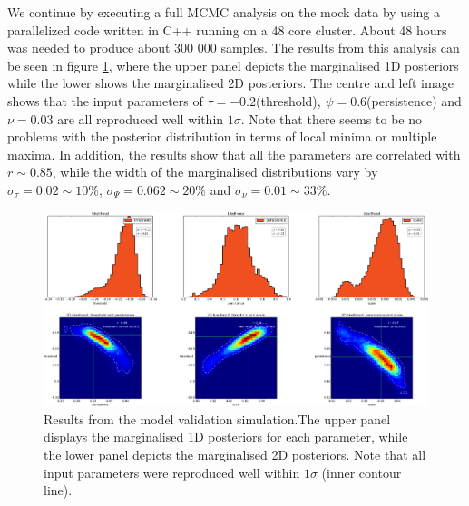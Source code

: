 \documentclass[aps,pre,twocolumn,letterpaper,floatfix,showpacs]{revtex4}
\begin{document}
We continue by executing a full MCMC analysis on the mock data by using a
parallelized code written in C++ running on a 48 core cluster. About 48 hours
was needed to produce about 300 000 samples. The results from this analysis
can be seen in figure \ref{fig:mockdataresults_pts}, where the upper panel
depicts the marginalised 1D posteriors while the lower shows the marginalised
2D posteriors. The centre and left image shows that the input parameters of
$\tau=-0.2$(threshold), $\psi=0.6$(persistence) and $\nu=0.03$ are all reproduced
well within $1 \sigma$. Note that there seems to be no problems with the posterior
distribution in terms of local minima or multiple maxima. In addition, the results
show that all the parameters are correlated with $r \sim 0.85$, while the width of
the marginalised distributions vary by $\sigma_\tau = 0.02 \sim 10\%$, $\sigma_\Psi = 0.062 \sim 20\%$ and $\sigma_\nu = 0.01 \sim 33\%$. 

\begin{figure}
\includegraphics[width=.99\textwidth]{mock_data_results_pts.png}
\caption{Results from the model validation simulation.The upper panel displays the marginalised 1D posteriors for each parameter, while the lower panel depicts the marginalised 2D posteriors. Note that all input parameters were reproduced well within $1 \sigma$ (inner contour line).}
\label{fig:mockdataresults_pts}
\end{figure}
\end{document}
